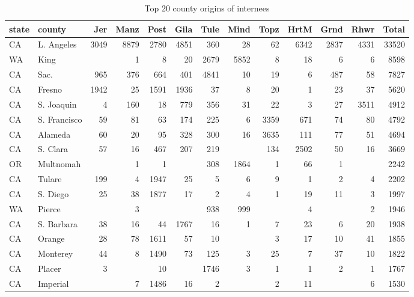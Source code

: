 \begin{table}[ht]
  \caption{\label{tbl:cmp-cty} Top 20 county origins of internees}
  \setlength{\tabcolsep}{4pt}
  \begin{adjustbox}{width=\textwidth, center}
  \begin{tabular}{|ll|r|r|r|r|r|r|r|r|r|r|r|}
    \hline
    state & county & Jer & Manz & Post & Gila & Tule & Mind & Topz & HrtM & Grnd & Rhwr & Total \\ 
    \hline
    CA & L. Angeles & 3049 & 8879 & 2780 & 4851 & 360 &  28 &  62 & 6342 & 2837 & 4331 & 33520 \\ 
    WA & King &  &   1 &   8 &  20 & 2679 & 5852 &   8 &  18 &   6 &   6 & 8598 \\ 
    CA & Sac. & 965 & 376 & 664 & 401 & 4841 &  10 &  19 &   6 & 487 &  58 & 7827 \\ 
    CA & Fresno & 1942 &  25 & 1591 & 1936 &  37 &   8 &  20 &   1 &  23 &  37 & 5620 \\ 
    CA & S. Joaquin &   4 & 160 &  18 & 779 & 356 &  31 &  22 &   3 &  27 & 3511 & 4912 \\ 
    CA & S. Francisco &  59 &  81 &  63 & 174 & 225 &   6 & 3359 & 671 &  74 &  80 & 4792 \\ 
    CA & Alameda &  60 &  20 &  95 & 328 & 300 &  16 & 3635 & 111 &  77 &  51 & 4694 \\ 
    CA & S. Clara &  57 &  16 & 467 & 207 & 219 &  & 134 & 2502 &  50 &  16 & 3669 \\ 
    OR & Multnomah &  &   1 &   1 &  & 308 & 1864 &   1 &  66 &   1 &  & 2242 \\ 
    CA & Tulare & 199 &   4 & 1947 &  25 &   5 &   6 &   9 &   1 &   2 &   4 & 2202 \\ 
    CA & S. Diego &  25 &  38 & 1877 &  17 &   2 &   4 &   1 &  19 &  11 &   3 & 1997 \\ 
    WA & Pierce &  &   3 &  &  & 938 & 999 &  &   4 &  &   2 & 1946 \\ 
    CA & S. Barbara &  38 &  16 &  44 & 1767 &  16 &   1 &   7 &  23 &   6 &  20 & 1938 \\ 
    CA & Orange &  28 &  78 & 1611 &  57 &  10 &  &   3 &  17 &  10 &  41 & 1855 \\ 
    CA & Monterey &  44 &   8 & 1490 &  73 & 125 &   3 &  25 &   7 &  37 &  10 & 1822 \\ 
    CA & Placer &   3 &  &  10 &  & 1746 &   3 &   1 &   1 &   2 &   1 & 1767 \\ 
    CA & Imperial &  &   7 & 1486 &  16 &   2 &  &   2 &  11 &  &   6 & 1530 \\ 

\end{tabular}
\end{adjustbox}
\end{table}
